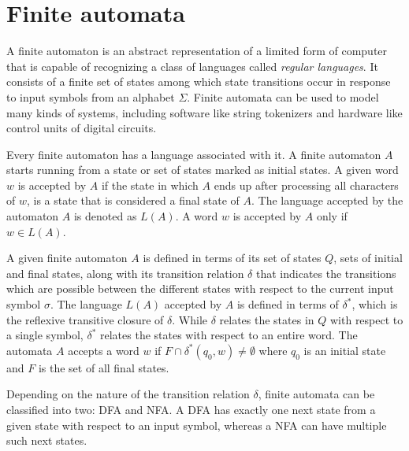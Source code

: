 \section{Finite automata}
A finite automaton is an abstract representation of a limited form of
computer that is capable of recognizing a class of languages called
\emph{regular languages}.
It consists of a finite set of states among which state transitions
occur in response to input symbols from an alphabet $\Sigma$.
Finite automata can be used to model many kinds of systems, including
software like string tokenizers and hardware like control units of
digital circuits.

Every finite automaton has a language associated with it.
A finite automaton $A$ starts running from a state or set of states
marked as initial states.
A given word $w$ is accepted by $A$ if the state in which $A$ ends up
after processing all characters of $w$, is a state that is considered
a final state of $A$.
The language accepted by the automaton $A$ is denoted as $L(A)$.
A word $w$ is accepted by $A$ only if $w \in L(A)$.

A given finite automaton $A$ is defined in terms of its set of states $Q$,
sets of initial and final states, along with its transition relation
$\delta$ that indicates the transitions which are possible between the
different states with respect to the current input symbol $\sigma$.
%
The language $L(A)$ accepted by $A$ is defined in terms of $\delta^*$,
which is the reflexive transitive closure of $\delta$.
While $\delta$ relates the states in $Q$ with respect to a single
symbol, $\delta^*$ relates the states with respect to an entire word.
The automata $A$ accepts a word $w$ if $F \cap \delta^*(q_0, w) \neq
\emptyset$ where $q_0$ is an initial state and $F$ is the set of all
final states.

Depending on the nature of the transition relation $\delta$, finite
automata can be classified into two: \gls{DFA} and \gls{NFA}.
A \gls{DFA} has exactly one next state from a given state with respect
to an input symbol, whereas a \gls{NFA} can have multiple such next
states.

